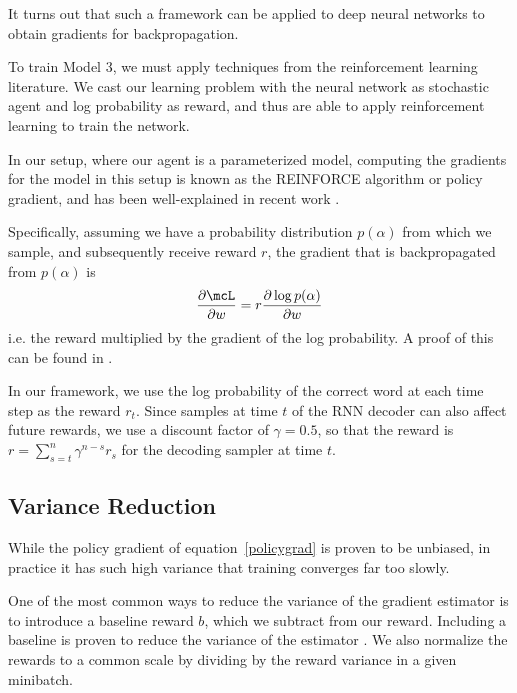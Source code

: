 \documentclass[11pt]{report}
\begin{document}

It turns out that such a framework can be applied to deep neural networks to obtain gradients for backpropagation. 



To train Model 3, we must apply techniques from the reinforcement learning literature. We cast our learning problem with the neural network as stochastic agent and log probability as reward, and thus are able to apply reinforcement learning to train the network.

In our setup, where our agent is a parameterized model, computing the gradients for the model in this setup is known as the REINFORCE algorithm \citep{williams1992reinforce} or policy gradient, and has been well-explained in recent work \citep{mnih2014visualattention, ba2015visualattention, schulman2015backprop}.

Specifically, assuming we have a probability distribution $p(\alpha)$ from which we sample, and subsequently receive reward $r$, the gradient that is backpropagated from $p(\alpha)$ is
\begin{equation}
\label{policygrad}
\frac{\partial \mcL}{\partial w}  = r \frac{\partial \log p(\alpha)}{\partial w}
\end{equation}
i.e. the reward multiplied by the gradient of the log probability. A proof of this can be found in \cite{williams1992reinforce}.

In our framework, we use the log probability of the correct word at each time step as the reward $r_t$. Since samples at time $t$ of the RNN decoder can also affect future rewards, we use a discount factor of $\gamma = 0.5$, so that the reward is $r = \sum_{s = t}^n \gamma^{n-s}r_s$ for the decoding sampler at time $t$.

\subsection{Variance Reduction}

While the policy gradient of equation~\ref{policygrad} is proven to be unbiased, in practice it has such high variance that training converges far too slowly.

One of the most common ways to reduce the variance of the gradient estimator is to introduce a baseline reward $b$, which we subtract from our reward. Including a baseline is proven to reduce the variance of the estimator \citep{mnih2014belief}. We also normalize the rewards to a common scale by dividing by the reward variance in a given minibatch.
\end{document}
